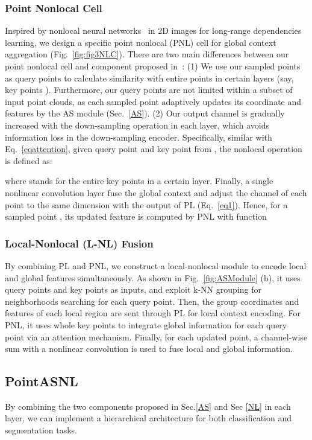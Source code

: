 \documentclass[10pt,twocolumn,letterpaper]{article}
\begin{document}
	\subsubsection{Point Nonlocal Cell} 
	Inspired by nonlocal neural networks~\cite{Nonlocal} in 2D images for long-range dependencies learning, we design a specific point nonlocal (PNL) cell for global context aggregation (Fig.~\ref{fig:fig3NLC}). There are two main differences between our point nonlocal cell and component proposed in~\cite{Nonlocal}: (1) We use our sampled points as query points to calculate similarity with entire points in certain layers (say, key points ). Furthermore, our query points are not limited within a subset of input point clouds, as each sampled point adaptively updates its coordinate and features by the AS module (Sec.~\ref{AS}). (2) Our output channel is gradually increased with the down-sampling operation in each layer, which avoids information loss in the down-sampling encoder. Specifically, similar with Eq.~\ref{eqattention}, given query point  and key point from , the nonlocal operation  is defined as:
	
	where  stands for the entire  key points in a certain layer. Finally, a single nonlinear convolution layer   fuse the global context and adjust the channel of each point to the same dimension with the output of PL  (Eq.~\ref{eq1}). Hence, for a sampled point ,  its updated feature is computed by PNL with function
	
	
	
	\subsubsection{Local-Nonlocal (L-NL) Fusion} 
	
	By combining PL and PNL, we construct a local-nonlocal module to encode local and global features simultaneously. As shown in Fig.~\ref{fig:ASModule} (b), it uses query points and key points as inputs, and exploit k-NN grouping for neighborhoods searching for each query point. Then, the group coordinates and features of each local region are sent through PL for local context encoding. For PNL, it uses whole key points  to integrate global information for each query point via an attention mechanism.  Finally, for each updated point, a channel-wise sum with a nonlinear convolution  is used to fuse local and global information.
	
	
	\subsection{PointASNL}
	\label{PNL}
	By combining the two components proposed in Sec.\ref{AS} and Sec \ref{NL} in each layer, we can implement a hierarchical architecture for both classification and segmentation tasks. 
	
\end{document}
